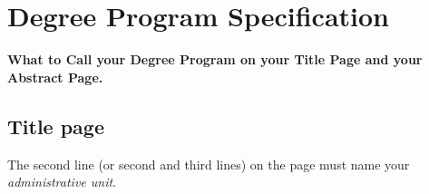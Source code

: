 \chapter{Degree Program Specification}
\label{app:degree-program}
\SingleSpacing*
{}

\vspace{-1.5em}
\centerline{\textbf{What to Call your Degree Program on your Title Page and your Abstract Page.}}
\vspace{1.5em}

\section{Title page}
The second line (or second and third lines) on the page must name your \emph{administrative unit}.

